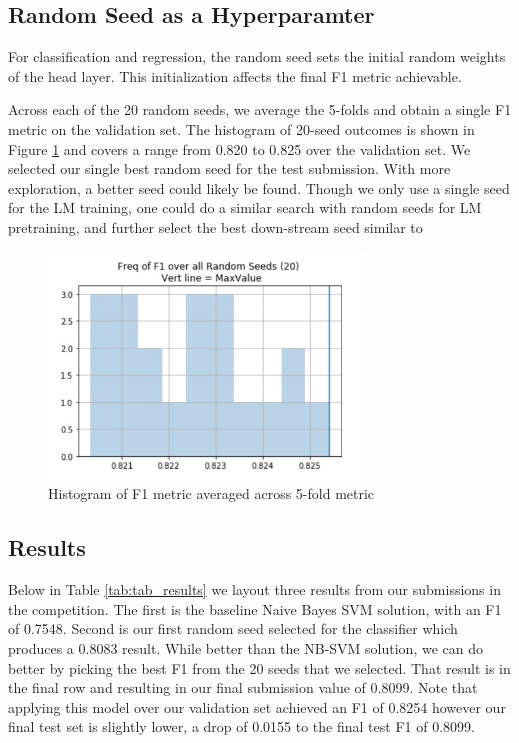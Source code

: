 \documentclass[smallextended]{svjour3}       %
\begin{document}
\subsection{Random Seed as a Hyperparamter}
\label{sec:rand_seeds}
For classification and regression, the random seed sets the initial random weights of the head layer. This initialization affects the final F1 metric achievable.  

Across each of the 20 random seeds, we average the 5-folds and obtain a single F1 metric on the validation set. The histogram of 20-seed outcomes is shown in Figure \ref{fig:random_seed_hist} and covers a range  from 0.820 to 0.825 over the validation set. We selected our single best random seed for the test submission. With more exploration, a better seed could likely be found.  Though we only use a single seed for the LM training, one could do a similar search with random seeds for LM pretraining, and further select the best down-stream seed similar to \cite{poleval}

\begin{figure}[ht]
	\includegraphics[width=0.75\textwidth]{seed_hist_f1}
	\caption{Histogram of F1 metric averaged across 5-fold metric}
	\label{fig:random_seed_hist}
\end{figure}

\subsection{Results}
Below in Table \ref{tab:tab_results} we layout three results from our submissions in the competition. The first is the baseline Naive Bayes SVM solution, with an F1 of 0.7548.  Second is our first random seed selected for the classifier which produces a 0.8083 result.  While better than the NB-SVM solution, we can do better by picking the best F1 from the 20 seeds that we selected. That result is in the final row and resulting in our final submission value of 0.8099. Note that applying this model over our validation set achieved an F1 of 0.8254 however our final test set is slightly lower, a drop of 0.0155 to the final test F1 of 0.8099.
\end{document}
